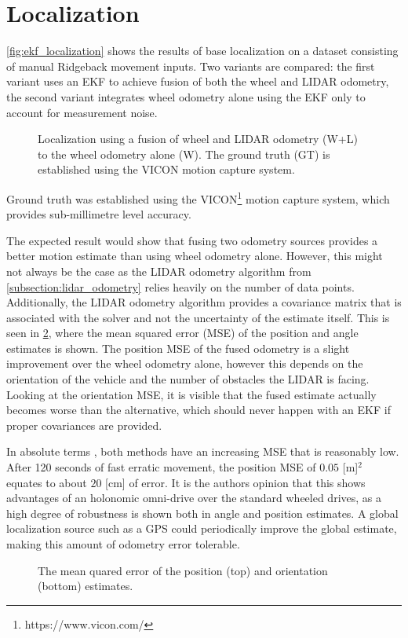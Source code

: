 \documentclass[times, utf8, diplomski, english]{fer}
\begin{document}
\section{Localization}
\autoref{fig:ekf_localization} shows the results of base localization on  a dataset consisting of manual Ridgeback movement inputs.
Two variants are compared: the first variant  uses an EKF to achieve fusion of both the wheel and LIDAR odometry, the second variant integrates wheel odometry alone using the EKF only to account for measurement noise.
\begin{figure}[h]
\centering

\caption{Localization using a fusion of wheel and LIDAR odometry (W+L) to the wheel odometry alone (W). The ground truth (GT) is established using the VICON motion capture system.}
\label{fig:ekf_localization}
\end{figure}
Ground truth was established using the VICON\footnote{https://www.vicon.com/} motion capture system, which provides sub-millimetre level accuracy.

The expected result would show that fusing two odometry sources provides a better motion estimate than using wheel odometry alone. 
However, this might not always be the case as the LIDAR odometry algorithm from \autoref{subsection:lidar_odometry} relies heavily on the number of data points.
Additionally, the LIDAR odometry algorithm provides a covariance matrix that is associated with the solver and not the uncertainty of the estimate itself.
This is seen in \ref{fig:mse_localization}, where the mean squared error (MSE) of the position and angle estimates is shown.
The position MSE of the fused odometry is a slight improvement over the wheel odometry alone, however this depends on the orientation of the vehicle and the number of obstacles the LIDAR is facing.
Looking at the orientation MSE, it is visible that the fused estimate actually becomes worse than the alternative, which should never happen with an EKF if proper covariances are provided.

In absolute terms , both methods have an increasing MSE that is reasonably low. 
After 120 seconds of fast erratic movement, the position MSE of $0.05$ [m]$^2$ equates to about $20$ [cm] of error.
It is the authors opinion that this shows advantages of an holonomic omni-drive over the standard wheeled drives, as a high degree of robustness is shown both in angle and position estimates.
A global localization source such as a GPS could periodically improve the global estimate, making this amount of odometry error tolerable.
\begin{figure}[h]
\centering

\caption{The mean quared error of the position (top) and orientation (bottom) estimates. }
\label{fig:mse_localization}
\end{figure}
\end{document}
